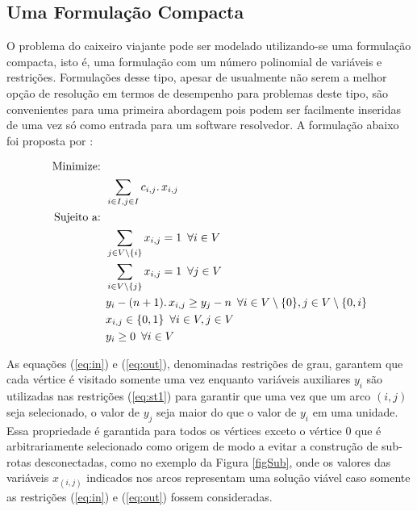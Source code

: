 \documentclass[a4paper,11pt,fleqn]{article}
\begin{document}
\subsection{Uma Formulação Compacta}

O problema do caixeiro viajante pode ser modelado utilizando-se uma
formulação compacta, isto é, uma formulação com um número polinomial
de variáveis e restrições. Formulações desse tipo, apesar de usualmente não serem a melhor opção de resolução em termos de desempenho para problemas
deste tipo, são convenientes para uma primeira abordagem pois podem
ser facilmente inseridas de uma vez só como entrada para um software
resolvedor. A formulação abaixo foi proposta por \cite{Miller1960}:

\begin{align}
    \textrm{Minimize: }   & \nonumber \\
    &  \sum_{i \in I, j \in I} c_{i,j} \ldotp x_{i,j} \\
    \textrm{Sujeito a: }   & \nonumber \\
    & \sum_{j \in V \setminus \{i\}} x_{i,j} = 1 \,\,\, \forall i \in V \label{eq:in}  \\
    & \sum_{i \in V \setminus \{j\}} x_{i,j} = 1 \,\,\, \forall j \in V \label{eq:out} \\
    & y_{i} -(n+1)\ldotp x_{i,j} \geq y_{j} -n  \,\,\, \forall i \in V\setminus \{0\}, j \in V\setminus \{0,i\} \label{eq:st1} \\
    & x_{i,j} \in \{0,1\} \,\,\, \forall i \in V, j \in V \\
    & y_i \geq 0 \,\,\, \forall i \in V 
\end{align}

As equações (\ref{eq:in}) e (\ref{eq:out}), denominadas restrições de grau,
garantem que cada vértice é visitado somente uma vez enquanto variáveis
auxiliares $y_{i}$ são utilizadas nas restrições (\ref{eq:st1}) para garantir
que uma vez que um arco $(i,j)$ seja selecionado, o valor de $y_{j}$ seja maior
do que o valor de $y_{i}$ em uma unidade. Essa propriedade é garantida para
todos os vértices exceto o vértice 0 que é arbitrariamente selecionado como
origem de modo a evitar a construção de sub-rotas desconectadas, como no
exemplo da Figura \ref{figSub}, onde os valores das variáveis $x_{(i,j)}$
indicados nos arcos representam uma solução viável caso somente as restrições
(\ref{eq:in}) e (\ref{eq:out}) fossem consideradas.
\end{document}
